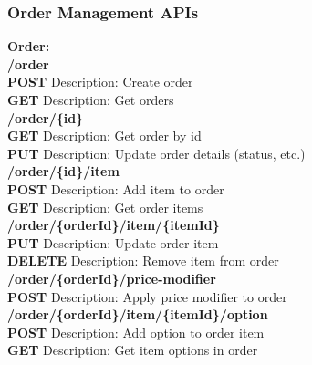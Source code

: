 \documentclass[11pt,a4paper,pdftex]{article}
\begin{document}
\subsubsection{Order Management APIs}
\textbf{Order:}\\
\hspace*{1em}\textbf{/order}\\
\hspace*{2em}\textbf{POST} Description: Create order\\
\hspace*{2em}\textbf{GET} Description: Get orders\\

\hspace*{1em}\textbf{/order/\{\textbf{id}\}}\\
\hspace*{2em}\textbf{GET} Description: Get order by id\\
\hspace*{2em}\textbf{PUT} Description: Update order details (status, etc.)\\

\hspace*{1em}\textbf{/order/\{\textbf{id}\}/item}\\
\hspace*{2em}\textbf{POST} Description: Add item to order\\
\hspace*{2em}\textbf{GET} Description: Get order items\\

\hspace*{1em}\textbf{/order/\{\textbf{orderId}\}/item/\{\textbf{itemId}\}}\\
\hspace*{2em}\textbf{PUT} Description: Update order item\\
\hspace*{2em}\textbf{DELETE} Description: Remove item from order\\

\hspace*{1em}\textbf{/order/\{\textbf{orderId}\}/price-modifier}\\
\hspace*{2em}\textbf{POST} Description: Apply price modifier to order\\

\hspace*{1em}\textbf{/order/\{\textbf{orderId}\}/item/\{\textbf{itemId}\}/option}\\
\hspace*{2em}\textbf{POST} Description: Add option to order item\\
\hspace*{2em}\textbf{GET} Description: Get item options in order\\
\end{document}
